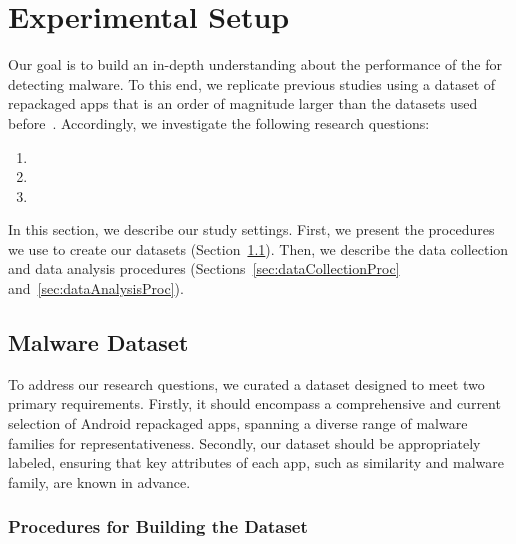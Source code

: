 \section{Experimental Setup}\label{sec:experimentalSetup}

Our goal is to build an in-depth understanding about
the performance of the \mas for detecting malware. To this
end, we replicate previous studies using a dataset of repackaged apps that is an order of magnitude
larger than the datasets used before~\cite{DBLP:conf/wcre/BaoLL18,DBLP:journals/jss/CostaMMSSBNR22}. Accordingly,
we investigate the following research questions:

\begin{enumerate}[(RQ1)]
\item \rqa
\item \rqc
\item \rqd
\end{enumerate}

In this section, we describe our study settings. First, we present the procedures we use to create our datasets (Section~\ref{sec:dataset}).  Then, we describe the data collection and data analysis procedures (Sections~\ref{sec:dataCollectionProc} and~\ref{sec:dataAnalysisProc}).


\subsection{Malware Dataset}\label{sec:dataset}


To address our research questions, we curated a dataset designed to meet two primary requirements.
Firstly, it should encompass a comprehensive and current selection of Android repackaged apps, spanning a diverse range of malware families for representativeness.
Secondly, our dataset should be appropriately labeled, ensuring that key attributes of each app, such as similarity and malware family, are known in advance.

\subsubsection{Procedures for Building the Dataset}


